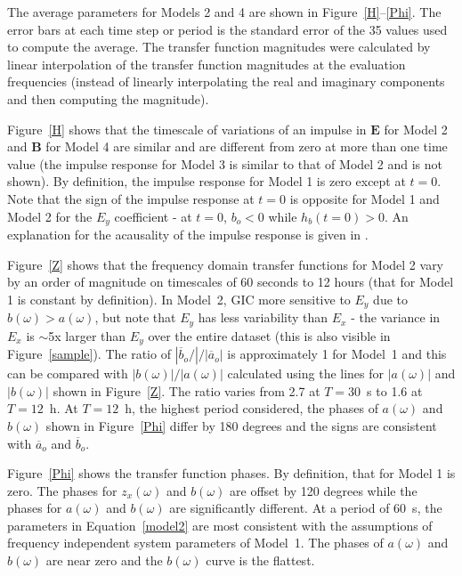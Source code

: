 \documentclass[draft,linenumbers]{agujournal2018}
\begin{document}

The average parameters for Models 2 and 4 are shown in Figure~\ref{H}--\ref{Phi}. The error bars at each time step or period is the standard error of the 35 values used to compute the average. The transfer function magnitudes were calculated by linear interpolation of the transfer function magnitudes at the evaluation frequencies (instead of linearly interpolating the real and imaginary components and then computing the magnitude).

Figure~\ref{H} shows that the timescale of variations of an impulse in $\mathbf{E}$ for Model 2 and $\mathbf{B}$ for Model 4 are similar and are different from zero at more than one time value (the impulse response for Model 3 is similar to that of Model 2 and is not shown). By definition, the impulse response for Model 1 is zero except at $t=0$. Note that the sign of the impulse response at $t=0$ is opposite for Model 1 and Model 2 for the $E_y$ coefficient - at $t=0$, $b_o < 0$ while $h_b(t=0)>0$. An explanation for the acausality of the impulse response is given in \cite{Kelbert2017}.

Figure~\ref{Z} shows that the frequency domain transfer functions for Model 2 vary by an order of magnitude on timescales of 60 seconds to 12 hours (that for Model 1 is constant by definition). In Model~2, GIC more sensitive to $E_y$ due to $b(\omega) > a(\omega)$, but note that $E_y$ has less variability than $E_x$ - the variance in $E_x$ is $\sim$5x larger than $E_y$ over the entire dataset (this is also visible in Figure~\ref{sample}). The ratio of $|\overline{b}_o/|/|\overline{a}_o|$ is approximately 1 for Model~1 and this can be compared with $|b(\omega)|/|a(\omega)|$ calculated using the lines for $|a(\omega)|$ and $|b(\omega)|$ shown in Figure~\ref{Z}. The ratio varies from 2.7 at $T=30$~s to 1.6 at $T=12$~h. At $T=12$~h, the highest period considered, the phases of $a(\omega)$ and $b(\omega)$ shown in Figure~\ref{Phi} differ by 180 degrees and the signs are consistent with $\overline{a}_o$ and $\overline{b}_o$. 

Figure~\ref{Phi} shows the transfer function phases. By definition, that for Model 1 is zero. The phases for $z_x(\omega)$ and $b(\omega)$ are offset by 120 degrees while the phases for $a(\omega)$ and $b(\omega)$ are significantly different.  At a period of $60$~s, the parameters in Equation~\ref{model2} are most consistent with the assumptions of frequency independent system parameters of Model~1. The phases of $a(\omega)$ and $b(\omega)$ are near zero and the $b(\omega)$ curve is the flattest.
\end{document}
